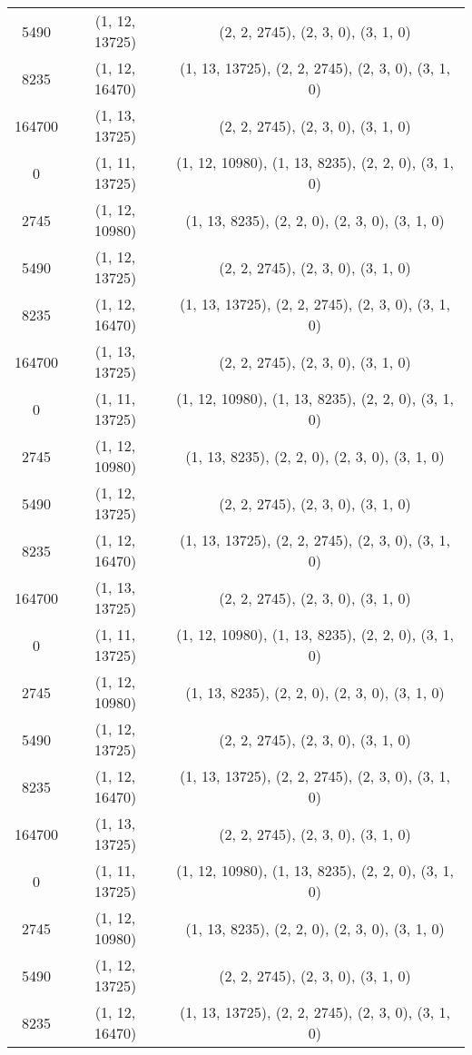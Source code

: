 \begin{center}
\begin{longtable}{ccc}
		5490   & (1, 12, 13725) & (2, 2, 2745), (2, 3, 0), (3, 1, 0) \\
		8235   & (1, 12, 16470) & (1, 13, 13725), (2, 2, 2745), (2, 3, 0), (3, 1, 0) \\
		164700 & (1, 13, 13725) & (2, 2, 2745), (2, 3, 0), (3, 1, 0) \\
		0      & (1, 11, 13725) & (1, 12, 10980), (1, 13, 8235), (2, 2, 0), (3, 1, 0) \\
		2745   & (1, 12, 10980) & (1, 13, 8235), (2, 2, 0), (2, 3, 0), (3, 1, 0) \\
		5490   & (1, 12, 13725) & (2, 2, 2745), (2, 3, 0), (3, 1, 0) \\
		8235   & (1, 12, 16470) & (1, 13, 13725), (2, 2, 2745), (2, 3, 0), (3, 1, 0) \\
		164700 & (1, 13, 13725) & (2, 2, 2745), (2, 3, 0), (3, 1, 0) \\
		0      & (1, 11, 13725) & (1, 12, 10980), (1, 13, 8235), (2, 2, 0), (3, 1, 0) \\
		2745   & (1, 12, 10980) & (1, 13, 8235), (2, 2, 0), (2, 3, 0), (3, 1, 0) \\
		5490   & (1, 12, 13725) & (2, 2, 2745), (2, 3, 0), (3, 1, 0) \\
		8235   & (1, 12, 16470) & (1, 13, 13725), (2, 2, 2745), (2, 3, 0), (3, 1, 0) \\ \noalign{\penalty-5000}
		164700 & (1, 13, 13725) & (2, 2, 2745), (2, 3, 0), (3, 1, 0) \\
		0      & (1, 11, 13725) & (1, 12, 10980), (1, 13, 8235), (2, 2, 0), (3, 1, 0) \\
		2745   & (1, 12, 10980) & (1, 13, 8235), (2, 2, 0), (2, 3, 0), (3, 1, 0) \\
		5490   & (1, 12, 13725) & (2, 2, 2745), (2, 3, 0), (3, 1, 0) \\
		8235   & (1, 12, 16470) & (1, 13, 13725), (2, 2, 2745), (2, 3, 0), (3, 1, 0) \\
		164700 & (1, 13, 13725) & (2, 2, 2745), (2, 3, 0), (3, 1, 0) \\
		0      & (1, 11, 13725) & (1, 12, 10980), (1, 13, 8235), (2, 2, 0), (3, 1, 0) \\
		2745   & (1, 12, 10980) & (1, 13, 8235), (2, 2, 0), (2, 3, 0), (3, 1, 0) \\
		5490   & (1, 12, 13725) & (2, 2, 2745), (2, 3, 0), (3, 1, 0) \\
		8235   & (1, 12, 16470) & (1, 13, 13725), (2, 2, 2745), (2, 3, 0), (3, 1, 0) \\

\end{longtable}
\end{center}
